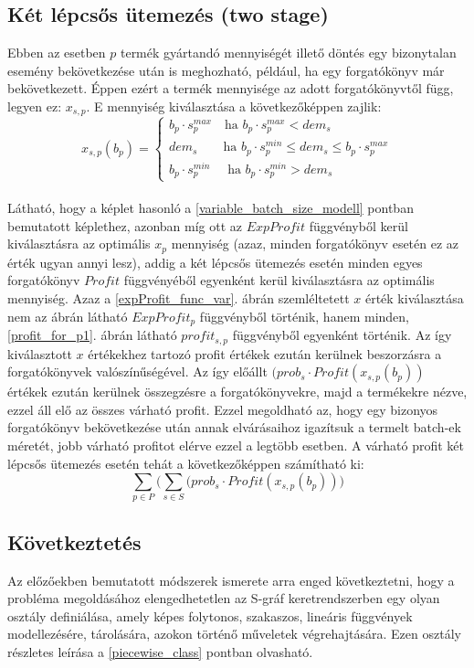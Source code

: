 \subsection{Két lépcsős ütemezés (two stage)} \label{TwoStage}
Ebben az esetben $p$ termék gyártandó mennyiségét illető döntés egy bizonytalan esemény bekövetkezése után is meghozható, például, ha egy forgatókönyv már bekövetkezett.
Éppen ezért a termék mennyisége az adott forgatókönyvtől függ, legyen ez: $x_{s,p}$. E mennyiség kiválasztása a következőképpen zajlik:
\begin{equation*}
x_{s,p}(b_p)= \begin{cases}
            b_p \cdot s_p^{max} \quad \text{ha } b_p \cdot s_p^{max}<dem_{s}\\
            dem_{s} \qquad \text{ha } b_p \cdot s_p^{min} \leq dem_{s} \leq b_p \cdot s_p^{max}\\
            b_p \cdot s_p^{min} \quad \text{ ha } b_p \cdot s_p^{min}>dem_{s}
       \end{cases}       
\end{equation*}\\
Látható, hogy a képlet hasonló a \ref{variable_batch_size_modell} pontban bemutatott képlethez, azonban míg ott  az $ExpProfit$ függvényből kerül kiválasztásra az optimális $x_p$ mennyiség (azaz, minden forgatókönyv esetén ez az érték ugyan annyi lesz), addig a két lépcsős ütemezés esetén minden egyes forgatókönyv $Profit$ függvényéből egyenként kerül kiválasztásra az optimális mennyiség.
Azaz a \ref{expProfit_func_var}. ábrán szemléltetett $x$ érték kiválasztása nem az ábrán látható $ExpProfit_p$ függvényből történik, hanem minden, \ref{profit_for_p1}. ábrán látható $profit_{s,p}$ függvényből egyenként történik.
Az így kiválasztott $x$ értékekhez tartozó profit értékek ezután kerülnek beszorzásra a forgatókönyvek valószínűségével.
Az így előállt $(prob_s \cdot Profit(x_{s,p}(b_p))$ értékek ezután kerülnek összegzésre a forgatókönyvekre, majd a termékekre nézve, ezzel áll elő az összes várható profit.
Ezzel megoldható az, hogy egy bizonyos forgatókönyv bekövetkezése után annak elvárásaihoz igazítsuk a termelt batch-ek méretét, jobb várható profitot elérve ezzel a legtöbb esetben.
A várható profit két lépcsős ütemezés esetén tehát a következőképpen számítható ki:
$$\sum_{p \in P} \bigg( \sum_{s \in S}(prob_s \cdot Profit(x_{s,p}(b_p)) \bigg)$$ 
\subsection{Következtetés} \label{piecewise_suggestion}
Az előzőekben bemutatott módszerek ismerete arra enged következtetni, hogy a probléma megoldásához elengedhetetlen az S-gráf keretrendszerben egy olyan osztály definiálása, amely képes  folytonos, szakaszos, lineáris függvények modellezésére, tárolására, azokon történő műveletek végrehajtására. Ezen osztály részletes leírása a \ref{piecewise_class} pontban olvasható.
